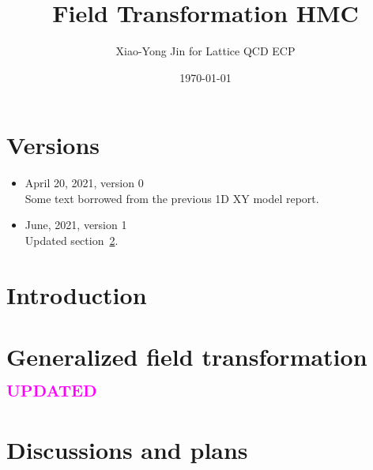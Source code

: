 


\author{Xiao-Yong Jin for Lattice QCD ECP}
\date{\today}
\title{Field Transformation HMC}


\maketitle
\tableofcontents

\section*{Versions}
\label{sec:versions}

\begin{itemize}
\item April 20, 2021, version 0\\
Some text borrowed from the previous 1D XY model report.
\item June, 2021, version 1\\
Updated section~\ref{sec:gen-ft}.
\end{itemize}

\section{Introduction}
\label{sec:intro}


\section{Generalized field transformation \textcolor{magenta}{\textsc{updated}}}
\label{sec:gen-ft}


%

\section{Discussions and plans}
\label{sec:discuss-plans}


\ifdefined\directlua
  \printbibliography
\else
  
  
\fi



